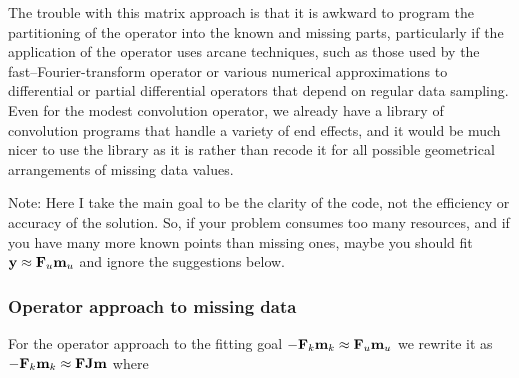\par
The trouble with this matrix approach is that it is awkward to program
the partitioning of the operator into the known and missing parts,
particularly if the application of the operator uses arcane techniques,
such as those used by the fast--Fourier-transform operator
or various numerical approximations to differential or partial
differential operators that depend on regular data sampling.
Even for the modest convolution operator,
we already have a library of convolution programs
that handle a variety of end effects,
and it would be much nicer to use the library as it is
rather than recode it for all possible geometrical arrangements
of missing data values.
\par
Note:
Here I take the main goal to be the clarity of the code,
not the efficiency or accuracy of the solution.
So, if your problem consumes too many resources,
and if you have many more known points than missing ones,
maybe you should fit
$\bold y \approx \bold F_u \bold m_u$
and ignore the suggestions below.

\subsubsection{Operator approach to missing data}
\par
For the operator approach to the fitting goal
$ -\bold F_k \bold m_k \approx \bold F_u \bold m_u$
we rewrite it as
$ -\bold F_k \bold m_k \approx \bold F \bold J \bold m $ where

